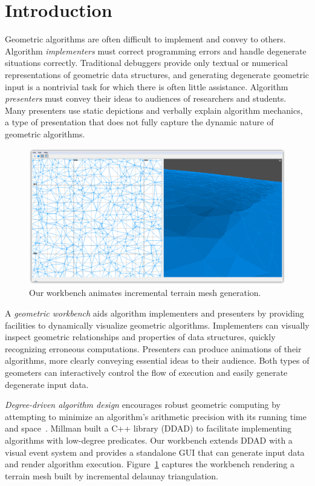 \section{Introduction}

Geometric algorithms are often difficult to implement and convey to others.
Algorithm \emph{implementers} must correct programming errors and handle
degenerate situations correctly. Traditional debuggers provide only textual or
numerical representations of geometric data structures, and generating
degenerate geometric input is a nontrivial task for which there is often little
assistance. Algorithm \emph{presenters} must convey their ideas to audiences of
researchers and students. Many presenters use static depictions and verbally
explain algorithm mechanics, a type of presentation that does not fully capture
the dynamic nature of geometric algorithms.

\begin{figure}[htb]
	\centering
	\includegraphics[width=\textwidth]{figures/currentstate-2}
	\caption{Our workbench animates incremental terrain mesh generation.} 
	\label{fig:currentstate}
\end{figure}

A \emph{geometric workbench} aids algorithm implementers and presenters by
providing facilities to dynamically visualize geometric algorithms. Implementers
can visually inspect geometric relationships and properties of data structures,
quickly recognizing erroneous computations. Presenters can produce
animations of their algorithms, more clearly conveying essential
ideas to their audience. Both types of geometers can interactively control the
flow of execution and easily generate degenerate input data.

\emph{Degree-driven algorithm design} encourages robust geometric computing by
attempting to minimize an algorithm's arithmetic precision with its running time
and space~\cite{millman2012degree}. Millman built a C++ library (DDAD) to
facilitate implementing algorithms with low-degree predicates. Our workbench
extends DDAD with a visual event system and provides a standalone GUI that can
generate input data and render algorithm execution.
Figure~\ref{fig:currentstate} captures the workbench rendering a terrain mesh
built by incremental delaunay triangulation.

